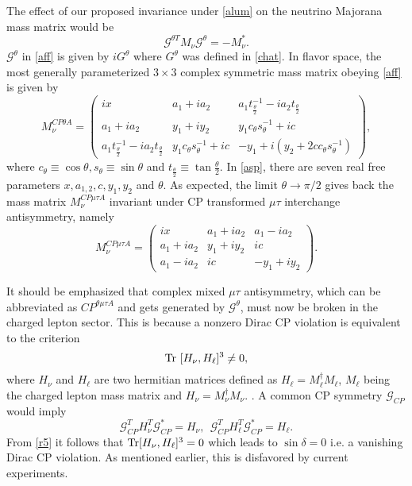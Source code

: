 \documentclass[11pt]{article}
\begin{document}
The effect of our proposed invariance under \eqref{alum} on the neutrino Majorana mass matrix would be \begin{equation} \mathcal{G}^{\theta T}M_\nu \mathcal{G}^\theta=-M_\nu^*\label{aff}.\end{equation} $\mathcal{G}^\theta$ in \eqref{aff} is given by $iG^\theta$ where $G^\theta$ was defined in \eqref{chat}. In flavor space, the most generally parameterized $3\times 3$ complex symmetric mass matrix obeying \eqref{aff} is given by \begin{equation}M^{CP\theta A}_\nu=\begin{pmatrix} ix & a_1+ia_2 & a_1t^{-1}_{\frac{\theta}{2}}-ia_2t_{\frac{\theta}{2}} \\a_1+ia_2 & y_1+iy_2 & y_1c_\theta s_\theta^{-1}+ic\\ a_1t^{-1}_{\frac{\theta}{2}}-ia_2t_{\frac{\theta}{2}} & y_1c_\theta s_\theta^{-1}+ic & -y_1+i(y_2+2cc_\theta s_\theta^{-1})
\end{pmatrix},\label{asp}\end{equation} where $c_\theta\equiv\cos\theta, s_\theta\equiv \sin\theta$ and $t_{\frac{\theta}{2}}\equiv\tan\frac{\theta}{2}$. In \eqref{asp}, there are seven real free parameters $x,a_{1,2},c,y_1,y_2$ and $\theta$. As expected, the limit $\theta\to\pi/2$ gives back the mass matrix $M^{CP\mu\tau A}_{\nu}$ invariant under CP transformed $\mu\tau$ interchange antisymmetry\cite{Samanta:2017kce}, namely\begin{equation}
M_{\nu}^{CP\mu\tau A}=\begin{pmatrix} ix & a_1+ia_2 & a_1-ia_2\\a_1+ia_2 & y_1+iy_2 & ic\\ a_1-ia_2 & ic & -y_1+iy_2\end{pmatrix}.\end{equation}

It should be emphasized that complex mixed $\mu\tau$ antisymmetry, which can be abbreviated as $CP^{\theta\mu\tau A}$ and gets generated by $\mathcal{G}^\theta$, must now be broken in the charged lepton sector. This is because a nonzero Dirac CP violation is equivalent to the criterion\begin{equation}{\rm Tr}~[H_\nu,H_\ell]^3\neq 0, \label{r4}
\end{equation} where $H_\nu$ and $H_\ell$ are two hermitian matrices defined as $H_\ell=M_\ell^\dagger M_\ell$, $M_\ell$ being the charged lepton mass matrix and $H_\nu=M_\nu^\dag M_\nu$. \cite{Bernabeu:1986fc}. A common CP symmetry $\mathcal{G}_{CP}$ would imply \begin{equation}\mathcal{G}_{CP}^T H_\nu^T \mathcal{G}_{CP}^*= H_\nu,~~\mathcal{G}_{CP}^T H_\ell^T \mathcal{G}_{CP}^*= H_\ell. \label{r5}\end{equation}From \eqref{r5} it follows that  ${\rm Tr}[H_\nu,H_\ell]^3= 0$  which leads to $\sin \delta =0$ i.e. a vanishing Dirac CP violation. As mentioned earlier, this is disfavored by current experiments.
\end{document}

